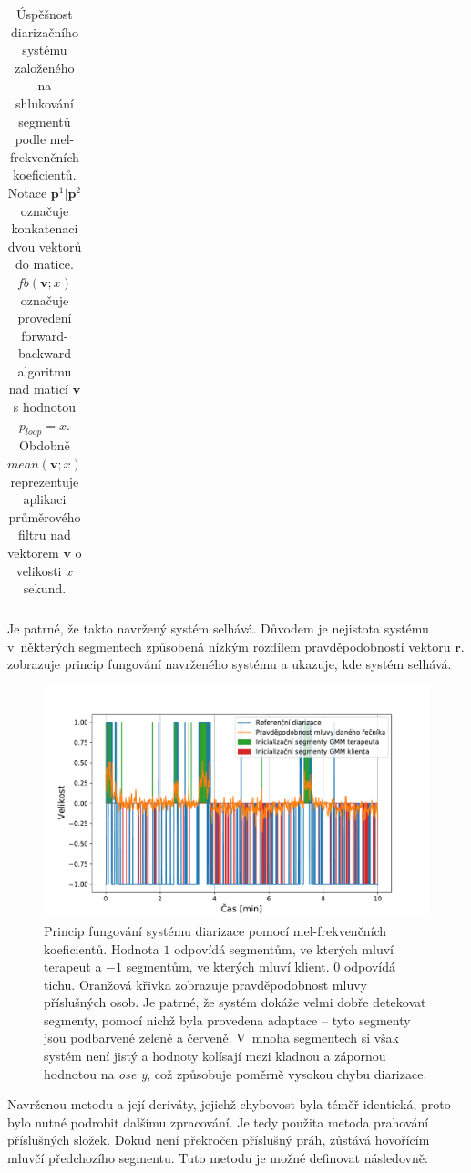 \begin{table}[H]
\begin{adjustbox}{width=\textwidth}
\begin{tabular}{ |c|c|c|c|c|c|c| }
    \hline
\end{tabular}
\end{adjustbox}
\caption{\label{tab:Diar_mfcc1_deepsy} Úspěšnost diarizačního systému založeného na shlukování segmentů podle mel-frekvenčních koeficientů. Notace $\mathbf{p}^{1}|\mathbf{p}^{2}$ označuje konkatenaci dvou vektorů do matice. $fb(\mathbf{v}; x)$ označuje provedení forward-backward algoritmu nad maticí $\mathbf{v}$ s hodnotou $p_{loop} = x$. Obdobně $mean(\mathbf{v}; x)$ reprezentuje aplikaci průměrového filtru nad vektorem $\mathbf{v}$ o velikosti $x$ sekund.}
\end{table}

Je patrné, že takto navržený systém selhává. Důvodem je nejistota systému v~některých segmentech způsobená nízkým rozdílem pravděpodobností vektoru $\mathbf{r}$.  zobrazuje princip fungování navrženého systému a ukazuje, kde systém selhává. 

\begin{figure}[H]
  \centering
  \includegraphics[width=0.97\linewidth]{obrazky-figures/mfcc_diff.pdf}
  \caption{Princip fungování systému diarizace pomocí mel-frekvenčních koeficientů. Hodnota $1$ odpovídá segmentům, ve kterých mluví terapeut a $-1$ segmentům, ve kterých mluví klient. $0$ odpovídá tichu. Oranžová křivka zobrazuje pravděpodobnost mluvy příslušných osob. Je patrné, že systém dokáže velmi dobře detekovat segmenty, pomocí nichž byla provedena adaptace -- tyto segmenty jsou podbarvené zeleně a červeně. V~mnoha segmentech si však systém není jistý a hodnoty kolísají mezi kladnou a zápornou hodnotou na \textit{ose y}, což způsobuje poměrně vysokou chybu diarizace.}
  \label{fig:MFCC_diar_failure}
\end{figure}

Navrženou metodu a její deriváty, jejichž chybovost byla téměř identická, proto bylo nutné podrobit dalšímu zpracování. Je tedy použita metoda prahování příslušných složek. Dokud není překročen příslušný práh, zůstává hovořícím mluvčí předchozího segmentu. Tuto metodu je možné definovat následovně:

